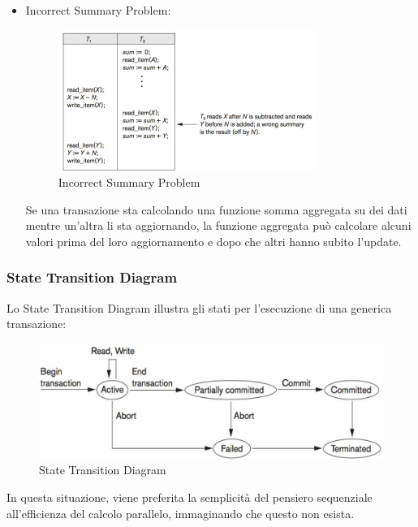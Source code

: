 \begin{itemize}
\item Incorrect Summary Problem:

\begin{center}
\begin{figure}[H]
\centering
\includegraphics[scale=1]{figures/isp.png}
\caption{Incorrect Summary Problem}
\end{figure}
\end{center}

Se una transazione sta calcolando una funzione somma aggregata su dei dati mentre un'altra li sta aggiornando, la funzione aggregata può calcolare alcuni valori prima del loro aggiornamento e dopo che altri hanno subito l'update.

\end{itemize}


\subsubsection{State Transition Diagram}

Lo State Transition Diagram illustra gli stati per l’esecuzione di una generica transazione:

\begin{center}
\begin{figure}[H]
\centering
\includegraphics[scale=1]{figures/std.png}
\caption{State Transition Diagram}
\end{figure}
\end{center}

In questa situazione, viene preferita la semplicità del pensiero sequenziale all’efficienza del calcolo parallelo, immaginando che questo non esista.

